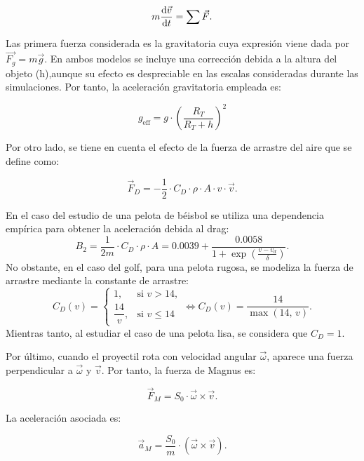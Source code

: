 \documentclass[11pt,a4paper]{article}
\begin{document}
\begin{equation}
m \dv{\vec{v}}{t} = \sum \vec{F}.
\end{equation}

Las primera fuerza considerada es la gravitatoria cuya expresión viene dada por $\vec{F_g}=m\vec{g}$. En ambos modelos se incluye una corrección debida a la altura del objeto (h),aunque su efecto es despreciable en las escalas consideradas durante las simulaciones. Por tanto, la aceleración gravitatoria empleada es:

\begin{equation}
g_{\text{eff}} = g \cdot \left( \frac{R_T}{R_T + h} \right)^2
\end{equation}

Por otro lado, se tiene en cuenta el efecto de la fuerza de arrastre del aire que se define como:

\begin{equation}
\vec{F}_D = -\frac{1}{2}\cdot C_D \cdot \rho \cdot A\cdot  v \cdot \vec{v}.
\end{equation}

En el caso del estudio de una pelota de béisbol se utiliza una dependencia empírica para obtener la aceleración debida al drag:
\[
B_2 = \frac{1}{2m} \cdot C_D \cdot  \rho\cdot  A = 0.0039 + \frac{0.0058}{1 + \exp\left(\frac{v - v_d}{\delta}\right)}.
\]
No obstante, en el caso del golf, para una pelota rugosa, se modeliza la fuerza de arrastre mediante la constante de arrastre:
\[
C_D(v) =
\begin{cases}
1, & \text{si } v > 14, \\
\dfrac{14}{v}, & \text{si } v \le 14
\end{cases}
\Longleftrightarrow C_D(v) = \frac{14}{\max(14,\, v)}.
\]
Mientras tanto, al estudiar el caso de una pelota lisa, se considera que $C_D=1$.

Por último, cuando el proyectil rota con velocidad angular $\vec{\omega}$, aparece una fuerza perpendicular a $\vec{\omega}$ y $\vec{v}$. Por tanto, la fuerza de Magnus es:

\begin{equation}
\vec{F}_M = S_0\cdot \vec{\omega} \times \vec{v}.
\end{equation}

La aceleración asociada es:

\begin{equation}
\vec{a}_M = \frac{S_0}{m} \cdot (\vec{\omega} \times \vec{v}).
\end{equation}
\end{document}
